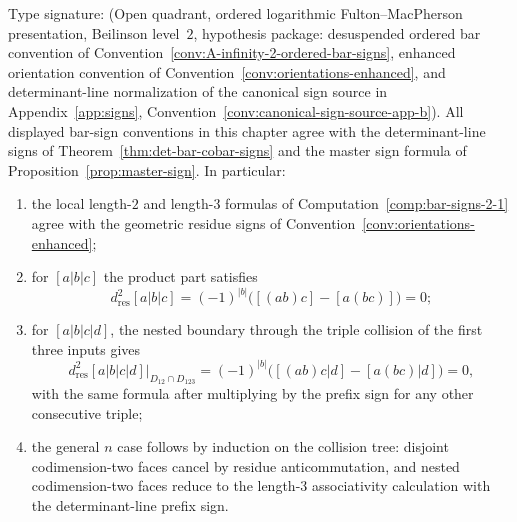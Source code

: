 \begin{theorem}
\label{thm:bar-sign-coherence}
Type signature: \textup{(}Open quadrant, ordered logarithmic
Fulton--MacPherson presentation, Beilinson level~$2$, hypothesis
package: desuspended ordered bar convention of
Convention~\ref{conv:A-infinity-2-ordered-bar-signs}, enhanced
orientation convention of
Convention~\ref{conv:orientations-enhanced}, and determinant-line
normalization of the canonical sign source in Appendix~\ref{app:signs},
Convention~\ref{conv:canonical-sign-source-app-b}\textup{)}.
All displayed bar-sign conventions in this chapter agree with the
determinant-line signs of Theorem~\ref{thm:det-bar-cobar-signs} and the
master sign formula of Proposition~\ref{prop:master-sign}. In
particular:
\begin{enumerate}[label=\textup{(\roman*)}]
\item the local length-$2$ and length-$3$ formulas of
Computation~\ref{comp:bar-signs-2-1} agree with the geometric residue
signs of Convention~\ref{conv:orientations-enhanced};
\item for $[a|b|c]$ the product part satisfies
\[
d_{\mathrm{res}}^2[a|b|c]
=(-1)^{|b|}\bigl([(ab)c]-[a(bc)]\bigr)=0;
\]
\item for $[a|b|c|d]$, the nested boundary through the triple
collision of the first three inputs gives
\[
d_{\mathrm{res}}^2[a|b|c|d]\big|_{D_{12}\cap D_{123}}
=(-1)^{|b|}\bigl([(ab)c|d]-[a(bc)|d]\bigr)=0,
\]
with the same formula after multiplying by the prefix sign for any
other consecutive triple;
\item the general $n$ case follows by induction on the collision tree:
disjoint codimension-two faces cancel by residue anticommutation, and
nested codimension-two faces reduce to the length-$3$ associativity
calculation with the determinant-line prefix sign.
\end{enumerate}
\end{theorem}

